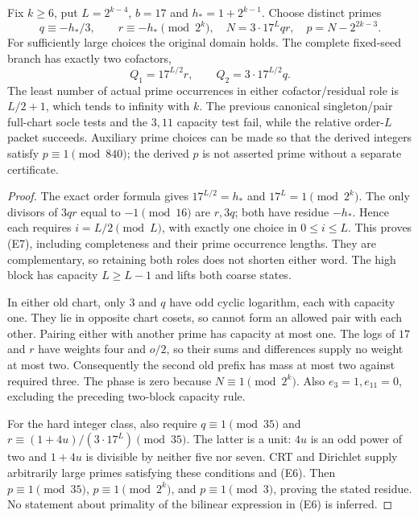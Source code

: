 \begin{theorem}
Fix $k\ge6$, put $L=2^{k-4}$, $b=17$ and $h_*=1+2^{k-1}$.
Choose distinct primes
\[
 q\equiv-h_*/3,\qquad r\equiv-h_*\pmod{2^k},
 \quad N=3\cdot17^Lqr,\quad p=N-2^{2k-3}.                  \tag{E6}
\]
For sufficiently large choices the original domain holds. The complete
fixed-seed branch has exactly two cofactors,
\[
 \boxed{Q_1=17^{L/2}r,\qquad Q_2=3\cdot17^{L/2}q.}         \tag{E7}
\]
The least number of actual prime occurrences in either cofactor/residual role
is $L/2+1$, which tends to infinity with $k$. The previous canonical
singleton/pair full-chart socle tests and the $3,11$ capacity test fail, while
the relative order-$L$ packet succeeds. Auxiliary prime choices can be made
so that the derived integers satisfy $p\equiv1\pmod{840}$; the derived $p$
is not asserted prime without a separate certificate.
\end{theorem}
\begin{proof}
The exact order formula gives $17^{L/2}=h_*$ and $17^L=1\pmod{2^k}$.
The only divisors of $3qr$ equal to $-1\pmod{16}$ are $r,3q$; both have
residue $-h_*$. Hence each requires $i=L/2\pmod L$, with exactly one choice
in $0\le i\le L$. This proves (E7), including completeness and their prime
occurrence lengths. They are complementary, so retaining both roles does not
shorten either word. The high block has capacity $L\ge L-1$ and lifts both
coarse states.

In either old chart, only $3$ and $q$ have odd cyclic logarithm, each with
capacity one. They lie in opposite chart cosets, so cannot form an allowed
pair with each other. Pairing either with another prime has capacity at most
one. The logs of $17$ and $r$ have weights four and $o/2$, so their sums and
differences supply no weight at most two. Consequently the second old prefix
has mass at most two against required three. The phase is zero because
$N\equiv1\pmod{2^k}$. Also $e_3=1,e_{11}=0$, excluding the preceding two-block
capacity rule.

For the hard integer class, also require $q\equiv1\pmod{35}$ and
$r\equiv(1+4u)/(3\cdot17^L)\pmod{35}$. The latter is a unit: $4u$ is an odd
power of two and $1+4u$ is divisible by neither five nor seven. CRT and
Dirichlet supply arbitrarily large primes satisfying these conditions and
(E6). Then $p\equiv1\pmod{35}$, $p\equiv1\pmod{2^k}$, and
$p\equiv1\pmod3$, proving the stated residue. No statement about primality of
the bilinear expression in (E6) is inferred.
\end{proof}

